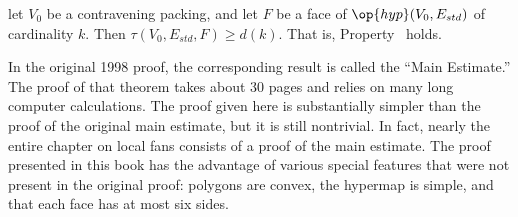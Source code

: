 %






\begin{lemma}\label{lemma:main} 
let $V_0$ be a contravening packing, and  let $F$ be a
face of $\op{hyp}(V_0,E_{std})$ of cardinality $k$.  Then
$\tau(V_0,E_{std},F) \ge d(k)$.
That is, Property~ holds.  
\end{lemma}
%
%


\begin{remark}
  In the original 1998 proof, the corresponding result is called the
  ``Main Estimate.''  The proof of that theorem takes about 30 pages
  and relies on many long computer calculations.  The proof given here
  is substantially simpler than the proof of the original main
  estimate, but it is still nontrivial. In fact, nearly the entire
  chapter on local fans consists of a proof of the main estimate.
  The proof presented in this book has the advantage of various
  special features that were not present in the original proof:
  polygons are convex, the hypermap is simple, and that each face has
  at most six sides.
\end{remark}




